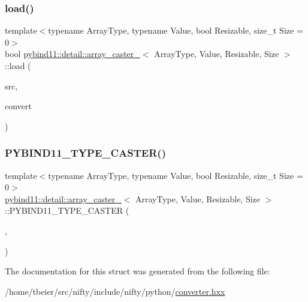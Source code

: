 \mbox{\label{structpybind11_1_1detail_1_1array__caster___a26ad1fb7dab7c82cd832c8c3a356fead}} 
\subsubsection{\texorpdfstring{load()}{load()}}
{\footnotesize\ttfamily template$<$typename Array\+Type, typename Value, bool Resizable, size\+\_\+t Size = 0$>$ \\
bool \hyperlink{structpybind11_1_1detail_1_1array__caster__}{pybind11\+::detail\+::array\+\_\+caster\+\_\+}$<$ Array\+Type, Value, Resizable, Size $>$\+::load (\begin{DoxyParamCaption}\item[{handle}]{src,  }\item[{bool}]{convert }\end{DoxyParamCaption})\hspace{0.3cm}{\ttfamily [inline]}}

\mbox{\label{structpybind11_1_1detail_1_1array__caster___a1feb38428c22749e65c159c0e63b9eb7}} 
\subsubsection{\texorpdfstring{P\+Y\+B\+I\+N\+D11\+\_\+\+T\+Y\+P\+E\+\_\+\+C\+A\+S\+T\+E\+R()}{PYBIND11\_TYPE\_CASTER()}}
{\footnotesize\ttfamily template$<$typename Array\+Type, typename Value, bool Resizable, size\+\_\+t Size = 0$>$ \\
\hyperlink{structpybind11_1_1detail_1_1array__caster__}{pybind11\+::detail\+::array\+\_\+caster\+\_\+}$<$ Array\+Type, Value, Resizable, Size $>$\+::P\+Y\+B\+I\+N\+D11\+\_\+\+T\+Y\+P\+E\+\_\+\+C\+A\+S\+T\+ER (\begin{DoxyParamCaption}\item[{Array\+Type}]{,  }\item[{\+\_\+(\char`\"{}List\mbox{[}\char`\"{})+value\+\_\+conv\+::name()+\+\_\+$<$ Resizable $>$(\+\_\+(\char`\"{}\char`\"{}), \+\_\+(\char`\"{}\mbox{[}\char`\"{})+\+\_\+$<$ Size $>$()+\+\_\+(\char`\"{}\mbox{]}\char`\"{}))+\+\_\+(\char`\"{}\mbox{]}\char`\"{})}]{ }\end{DoxyParamCaption})}



The documentation for this struct was generated from the following file\+:\begin{DoxyCompactItemize}
\item 
/home/tbeier/src/nifty/include/nifty/python/\hyperlink{converter_8hxx}{converter.\+hxx}\end{DoxyCompactItemize}
